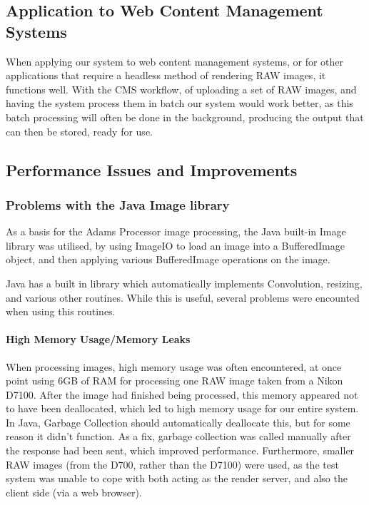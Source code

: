 \documentclass[11pt,a4paper]{article}
\begin{document}
\subsection{Application to Web Content Management Systems}
When applying our system to web content management systems, or for other applications that require a headless method
of rendering RAW images, it functions well. With the CMS workflow, of uploading a set of RAW images, and having the system
process them in batch our system would work better, as this batch processing will often be done in the background, producing
the output that can then be stored, ready for use.

\subsection{Performance Issues and Improvements}
\subsubsection{Problems with the Java Image library}
As a basis for the Adams Processor image processing, the Java built-in Image library was utilised,
by using ImageIO to load an image into a BufferedImage object, and then applying various BufferedImage operations on
the image.

Java has a built in library which automatically implements Convolution, resizing, and various other routines. While
this is useful, several problems were encounted when using this routines. 

\paragraph{High Memory Usage/Memory Leaks}
When processing images, high memory usage was often encountered, at once point using 6GB of RAM for processing 
one RAW image taken from a Nikon D7100. After the image had finished being processed, this memory appeared not to
have been deallocated, which led to high memory usage for our entire system. In Java, Garbage Collection should automatically
deallocate this, but for some reason it didn't function. As a fix, garbage collection was called manually after the response had been sent,
which improved performance. Furthermore, smaller RAW images (from the D700, rather than the D7100) were used, as the test system was unable to cope
with both acting as the render server, and also the client side (via a web browser).
\end{document}
